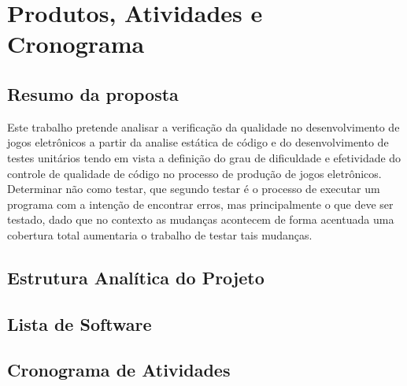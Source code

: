 \chapter[Produtos, Atividades e Cronograma]{Produtos, Atividades e Cronograma}

\section{Resumo da proposta}
	Este trabalho pretende analisar a verificação da qualidade no desenvolvimento de jogos eletrônicos a partir da analise estática de código e do desenvolvimento de testes unitários tendo em vista a definição do grau de dificuldade e efetividade do controle de qualidade de código no processo de produção de jogos eletrônicos.
	Determinar não como testar, que segundo  testar é o processo de executar um programa com a intenção de encontrar erros, mas principalmente o que deve ser testado, dado que no contexto as mudanças acontecem de forma acentuada uma cobertura total aumentaria o trabalho de testar tais mudanças.
\section{Estrutura Analítica do Projeto}
\section{Lista de Software}
\section{Cronograma de Atividades}
